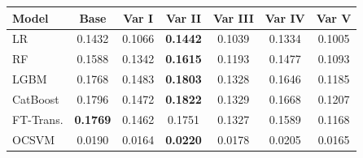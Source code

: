 \begin{tabular}{l c c c c c c}
\toprule
Model & Base & Var I & Var II & Var III & Var IV & Var V \\
\midrule
LR         & 0.1432 & 0.1066 & \textbf{0.1442} & 0.1039 & 0.1334 & 0.1005 \\
RF         & 0.1588 & 0.1342 & \textbf{0.1615} & 0.1193 & 0.1477 & 0.1093 \\
LGBM       & 0.1768 & 0.1483 & \textbf{0.1803} & 0.1328 & 0.1646 & 0.1185 \\
CatBoost   & 0.1796 & 0.1472 & \textbf{0.1822} & 0.1329 & 0.1668 & 0.1207 \\
FT-Trans.  & \textbf{0.1769} & 0.1462 & 0.1751 & 0.1327 & 0.1589 & 0.1168 \\
OCSVM      & 0.0190 & 0.0164 & \textbf{0.0220} & 0.0178 & 0.0205 & 0.0165 \\
\bottomrule
\end{tabular}
